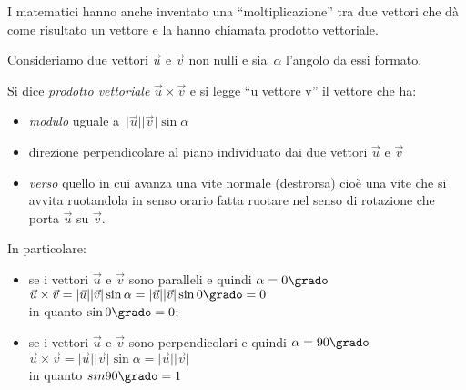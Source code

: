 I matematici hanno anche inventato una ``moltiplicazione'' tra due vettori che
dà come risultato un vettore e la hanno chiamata prodotto vettoriale.


\begin{inaccessibleblock}
 \begin{center}
  \scalebox{.8}{}
 \end{center}
\end{inaccessibleblock}


Consideriamo due vettori $\vec{u}$ e $\vec{v}$ non nulli e 
sia~$\alpha$ l'angolo da essi formato.

\begin{definizione}
 Si dice \emph{prodotto vettoriale} $\vec{u} \times \vec{v}$
 e si legge ``u vettore v'' il vettore che ha: 
 \begin{itemize} [noitemsep]
  \item \emph{modulo} uguale 
   a~$\lvert\vec{u}\rvert\lvert\vec{v}\rvert \sin \alpha$
  \item direzione perpendicolare al piano individuato dai due 
   vettori $\vec{u}$ e $\vec{v}$
  \item \emph{verso} quello in cui avanza una vite normale (destrorsa) 
   cioè una vite che si avvita ruotandola in senso orario
   fatta ruotare nel senso di rotazione che porta $\vec{u}$ su $\vec{v}$.
 \end{itemize}
\end{definizione}
 
In particolare:
\begin{itemize} [noitemsep]
 \item se i vettori $\vec{u}$ e $\vec{v}$ sono paralleli e 
  quindi $\alpha=0\grado$
  \(\vec{u} \times \vec{v} = 
    \lvert\vec{u}\rvert\lvert\vec{v}\rvert \sin \alpha=
    \lvert\vec{u}\rvert\lvert\vec{v}\rvert \sin 0\grado=0\) \\
  in quanto $\sin 0\grado = 0$;
 \item se i vettori $\vec{u}$ e $\vec{v}$ sono perpendicolari e 
  quindi $\alpha=90\grado$
  \(\vec{u} \times \vec{v} = 
    \lvert\vec{u}\rvert\lvert\vec{v}\rvert \sin \alpha=
    \lvert\vec{u}\rvert\lvert\vec{v}\rvert\)\\
  in quanto $sin 90\grado = 1$
\end{itemize}


